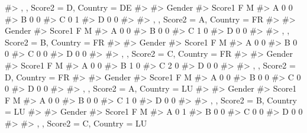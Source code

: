 \documentclass[
  letterpaper,
  DIV=11,
  numbers=noendperiod]{scrreprt}
\newenvironment{Shaded}{\begin{snugshade}}{\end{snugshade}}
\newcommand{\CommentTok}[1]{\textcolor[rgb]{0.37,0.37,0.37}{#1}}
\begin{document}
\begin{Shaded}
\begin{Highlighting}[]
\CommentTok{\#\textgreater{} , , Score2 = D, Country = DE}
\CommentTok{\#\textgreater{} }
\CommentTok{\#\textgreater{}       Gender}
\CommentTok{\#\textgreater{} Score1 F M}
\CommentTok{\#\textgreater{}      A 0 0}
\CommentTok{\#\textgreater{}      B 0 0}
\CommentTok{\#\textgreater{}      C 0 1}
\CommentTok{\#\textgreater{}      D 0 0}
\CommentTok{\#\textgreater{} }
\CommentTok{\#\textgreater{} , , Score2 = A, Country = FR}
\CommentTok{\#\textgreater{} }
\CommentTok{\#\textgreater{}       Gender}
\CommentTok{\#\textgreater{} Score1 F M}
\CommentTok{\#\textgreater{}      A 0 0}
\CommentTok{\#\textgreater{}      B 0 0}
\CommentTok{\#\textgreater{}      C 1 0}
\CommentTok{\#\textgreater{}      D 0 0}
\CommentTok{\#\textgreater{} }
\CommentTok{\#\textgreater{} , , Score2 = B, Country = FR}
\CommentTok{\#\textgreater{} }
\CommentTok{\#\textgreater{}       Gender}
\CommentTok{\#\textgreater{} Score1 F M}
\CommentTok{\#\textgreater{}      A 0 0}
\CommentTok{\#\textgreater{}      B 0 0}
\CommentTok{\#\textgreater{}      C 0 0}
\CommentTok{\#\textgreater{}      D 0 0}
\CommentTok{\#\textgreater{} }
\CommentTok{\#\textgreater{} , , Score2 = C, Country = FR}
\CommentTok{\#\textgreater{} }
\CommentTok{\#\textgreater{}       Gender}
\CommentTok{\#\textgreater{} Score1 F M}
\CommentTok{\#\textgreater{}      A 0 0}
\CommentTok{\#\textgreater{}      B 1 0}
\CommentTok{\#\textgreater{}      C 2 0}
\CommentTok{\#\textgreater{}      D 0 0}
\CommentTok{\#\textgreater{} }
\CommentTok{\#\textgreater{} , , Score2 = D, Country = FR}
\CommentTok{\#\textgreater{} }
\CommentTok{\#\textgreater{}       Gender}
\CommentTok{\#\textgreater{} Score1 F M}
\CommentTok{\#\textgreater{}      A 0 0}
\CommentTok{\#\textgreater{}      B 0 0}
\CommentTok{\#\textgreater{}      C 0 0}
\CommentTok{\#\textgreater{}      D 0 0}
\CommentTok{\#\textgreater{} }
\CommentTok{\#\textgreater{} , , Score2 = A, Country = LU}
\CommentTok{\#\textgreater{} }
\CommentTok{\#\textgreater{}       Gender}
\CommentTok{\#\textgreater{} Score1 F M}
\CommentTok{\#\textgreater{}      A 0 0}
\CommentTok{\#\textgreater{}      B 0 0}
\CommentTok{\#\textgreater{}      C 1 0}
\CommentTok{\#\textgreater{}      D 0 0}
\CommentTok{\#\textgreater{} }
\CommentTok{\#\textgreater{} , , Score2 = B, Country = LU}
\CommentTok{\#\textgreater{} }
\CommentTok{\#\textgreater{}       Gender}
\CommentTok{\#\textgreater{} Score1 F M}
\CommentTok{\#\textgreater{}      A 0 1}
\CommentTok{\#\textgreater{}      B 0 0}
\CommentTok{\#\textgreater{}      C 0 0}
\CommentTok{\#\textgreater{}      D 0 0}
\CommentTok{\#\textgreater{} }
\CommentTok{\#\textgreater{} , , Score2 = C, Country = LU}

\end{Highlighting}
\end{Shaded}
\end{document}
